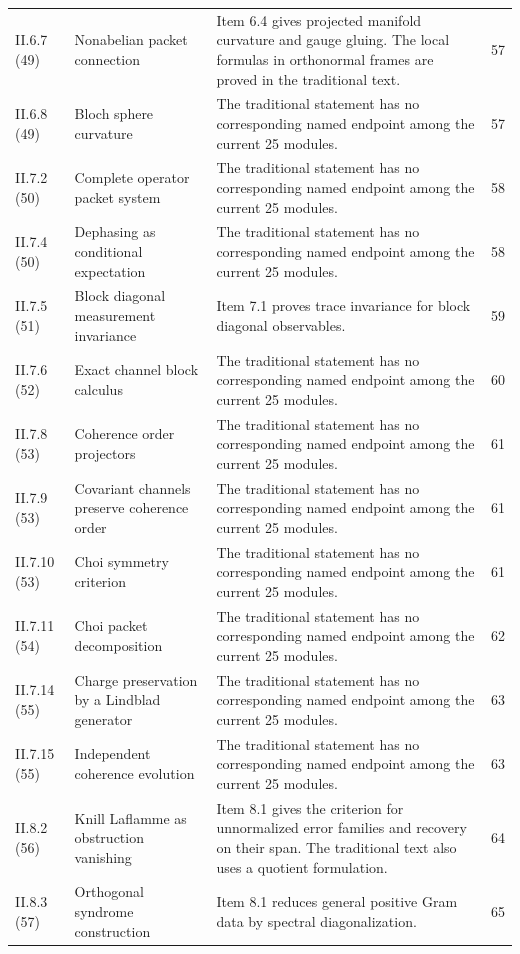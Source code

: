 {\begin{longtable}{@{}p{.13\linewidth}p{.31\linewidth}p{.42\linewidth}r@{}}
II.6.7 (49) & Nonabelian packet connection & Item 6.4 gives projected manifold curvature and gauge gluing. The local formulas in orthonormal frames are proved in the traditional text. & 57\\
II.6.8 (49) & Bloch sphere curvature & The traditional statement has no corresponding named endpoint among the current 25 modules. & 57\\
II.7.2 (50) & Complete operator packet system & The traditional statement has no corresponding named endpoint among the current 25 modules. & 58\\
II.7.4 (50) & Dephasing as conditional expectation & The traditional statement has no corresponding named endpoint among the current 25 modules. & 58\\
II.7.5 (51) & Block diagonal measurement invariance & Item 7.1 proves trace invariance for block diagonal observables. & 59\\
II.7.6 (52) & Exact channel block calculus & The traditional statement has no corresponding named endpoint among the current 25 modules. & 60\\
II.7.8 (53) & Coherence order projectors & The traditional statement has no corresponding named endpoint among the current 25 modules. & 61\\
II.7.9 (53) & Covariant channels preserve coherence order & The traditional statement has no corresponding named endpoint among the current 25 modules. & 61\\
II.7.10 (53) & Choi symmetry criterion & The traditional statement has no corresponding named endpoint among the current 25 modules. & 61\\
II.7.11 (54) & Choi packet decomposition & The traditional statement has no corresponding named endpoint among the current 25 modules. & 62\\
II.7.14 (55) & Charge preservation by a Lindblad generator & The traditional statement has no corresponding named endpoint among the current 25 modules. & 63\\
II.7.15 (55) & Independent coherence evolution & The traditional statement has no corresponding named endpoint among the current 25 modules. & 63\\
II.8.2 (56) & Knill Laflamme as obstruction vanishing & Item 8.1 gives the criterion for unnormalized error families and recovery on their span. The traditional text also uses a quotient formulation. & 64\\
II.8.3 (57) & Orthogonal syndrome construction & Item 8.1 reduces general positive Gram data by spectral diagonalization. & 65\\

\end{longtable}}
